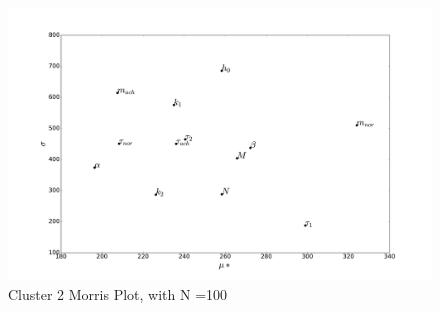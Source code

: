 \documentclass[fleqn,10pt]{wlscirep}
\begin{document}
\begin{figure}[ht]
                \centering
        \includegraphics[width=\linewidth]{figures/MorrisPlotN100Cluster2}
       \caption{Cluster 2 Morris Plot, with N =100}
       \label{fig:Cluster2Morris}
\end{figure}


\end{document}
